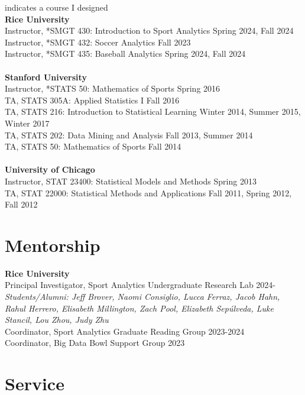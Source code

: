 \documentclass{article}
\begin{document}
\vspace{-4mm}\hfill * indicates a course I designed\\
{\bf Rice University}\\
Instructor, *SMGT 430: Introduction to Sport Analytics \hfill Spring 2024, Fall 2024\\
Instructor, *SMGT 432: Soccer Analytics \hfill Fall 2023\\
Instructor, *SMGT 435: Baseball Analytics \hfill Spring 2024, Fall 2024\\
~\\
{\bf Stanford University}\\
Instructor, *STATS 50: Mathematics of Sports \hspace{5mm} \hfill Spring 2016\\
TA, STATS 305A: Applied Statistics I \hfill Fall 2016\\
TA, STATS 216: Introduction to Statistical Learning \hfill Winter 2014, Summer 2015, Winter 2017\\
TA, STATS 202: Data Mining and Analysis \hfill Fall 2013, Summer 2014\\
TA, STATS 50: Mathematics of Sports \hfill Fall 2014\\
~\\
{\bf University of Chicago}\\
Instructor, STAT 23400: Statistical Models and Methods \hfill Spring 2013\\
TA, STAT 22000: Statistical Methods and Applications \hfill Fall 2011, Spring 2012, Fall 2012


\section*{\sc Mentorship}

{\bf Rice University}\\
Principal Investigator, Sport Analytics Undergraduate Research Lab \hfill 2024-\\
{\it Students/Alumni: Jeff Brover, Naomi Consiglio, Lucca Ferraz, Jacob Hahn, Rahul Herrero, Elisabeth Millington, Zach Pool, Elizabeth Sep\'ulveda, Luke Stancil, Lou Zhou, Judy Zhu}\\
Coordinator, Sport Analytics Graduate Reading Group \hfill 2023-2024\\
Coordinator, Big Data Bowl Support Group \hfill 2023

\section*{\sc Service}
\end{document}
